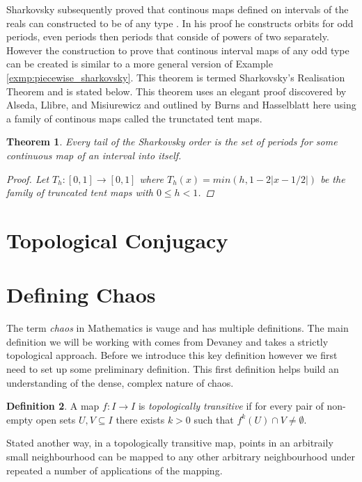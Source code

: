 \documentclass[11pt,a4paper,oneside]{memoir}
\theoremstyle{plain}
\newtheorem{thm}{Theorem}[chapter]
\theoremstyle{definition}
\newtheorem{defn}[thm]{Definition}
\begin{document}
Sharkovsky subsequently proved that continous maps defined on intervals of the reals can constructed to be of any type \cite{sharkovsky} \cite{sharkovsky2}. In his proof he constructs orbits for odd periods, even periods then periods that conside of powers of two separately. However the construction to prove that continous interval maps of any odd type can be created is similar to a more general version of Example \ref{exmp:piecewise_sharkovsky}. This theorem is termed Sharkovsky's Realisation Theorem and is stated below. This theorem uses an elegant proof discovered by Alseda, Llibre, and Misiurewicz \cite{alm} and outlined by Burns and Hasselblatt here \cite{burns-hasselblatt} using a family of continous maps called the trunctated tent maps.

\begin{thm}
    Every tail of the Sharkovsky order is the set of periods for some continuous map of an interval into itself.
    \begin{proof}
        Let $T_h: [0, 1] \to [0, 1]$ where $T_h(x) = min(h, 1-2|x-1/2|)$ be the family of truncated tent maps with $0 \leq h < 1$.
    \end{proof}
\end{thm}

\section{Topological Conjugacy}


\section{Defining Chaos}
The term \emph{chaos} in Mathematics is vauge and has multiple definitions. The main definition we will be working with comes from Devaney \cite{devaney} and takes a strictly topological approach. Before we introduce this key definition however we first need to set up some preliminary definition. This first definition helps build an understanding of the dense, complex nature of chaos.
\begin{defn}
    A map $f: I \to I$ is \emph{topologically transitive} if for every pair of non-empty open sets $U, V \subseteq I$ there exists $k > 0$ such that $f^k(U) \cap V \neq \emptyset$.
\end{defn}
Stated another way, in a topologically transitive map, points in an arbitraily small neighbourhood can be mapped to any other arbitrary neighbourhood under repeated a number of applications of the mapping. 
\end{document}
